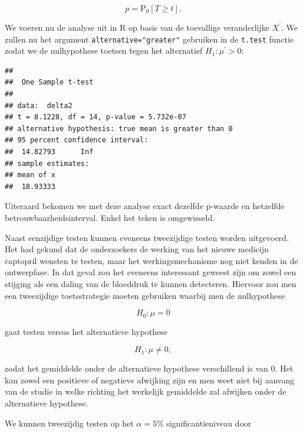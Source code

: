 \documentclass[
  12pt,dutch]{book}
\newenvironment{Shaded}{\begin{snugshade}}{\end{snugshade}}
\newcommand{\AttributeTok}[1]{\textcolor[rgb]{0.13,0.29,0.53}{#1}}
\newcommand{\FunctionTok}[1]{\textcolor[rgb]{0.13,0.29,0.53}{\textbf{#1}}}
\newcommand{\NormalTok}[1]{#1}
\newcommand{\OtherTok}[1]{\textcolor[rgb]{0.56,0.35,0.01}{#1}}
\newcommand{\SpecialCharTok}[1]{\textcolor[rgb]{0.81,0.36,0.00}{\textbf{#1}}}
\newcommand{\StringTok}[1]{\textcolor[rgb]{0.31,0.60,0.02}{#1}}
\theoremstyle{definition}
\theoremstyle{definition}
\theoremstyle{definition}
\theoremstyle{definition}
\theoremstyle{remark}
\begin{document}
\[p=\text{P}_0\left[T\geq t\right].\]

We voeren nu de analyse uit in R op basis van de toevallige veranderlijke \(X^\prime\). We zullen nu het argument \texttt{alternative="greater"} gebruiken in de \texttt{t.test} functie zodat we de nulhypothese toetsen tegen het alternatief \(H_1: \mu^\prime>0\):

\begin{Shaded}
\end{Shaded}

\begin{verbatim}
## 
##  One Sample t-test
## 
## data:  delta2
## t = 8.1228, df = 14, p-value = 5.732e-07
## alternative hypothesis: true mean is greater than 0
## 95 percent confidence interval:
##  14.82793      Inf
## sample estimates:
## mean of x 
##  18.93333
\end{verbatim}

Uiteraard bekomen we met deze analyse exact dezelfde p-waarde en hetzelfde betrouwbaarheidsinterval. Enkel het teken is omgewisseld.

Naast eenzijdige testen kunnen eveneens tweezijdige testen worden uitgevoerd.
Het had gekund dat de onderzoekers de werking van het nieuwe medicijn captopril wensten te testen, maar het werkingsmechanisme nog niet kenden in de ontwerpfase. In dat geval zou het eveneens interessant geweest zijn om zowel een stijging als een daling van de bloeddruk te kunnen detecteren.
Hiervoor zou men een tweezijdige toetsstrategie moeten gebruiken waarbij men de nulhypothese

\[H_0: \mu=0\]

gaat testen versus het alternatieve hypothese

\[H_1: \mu\neq0,\]

zodat het gemiddelde onder de alternatieve hypothese verschillend is van \(0\). Het kan zowel een positieve of negatieve afwijking zijn en men weet niet bij aanvang van de studie in welke richting het werkelijk gemiddelde zal afwijken onder de alternatieve hypothese.

We kunnen tweezijdig testen op het \(\alpha=5\%\) significantieniveau door
\end{document}
